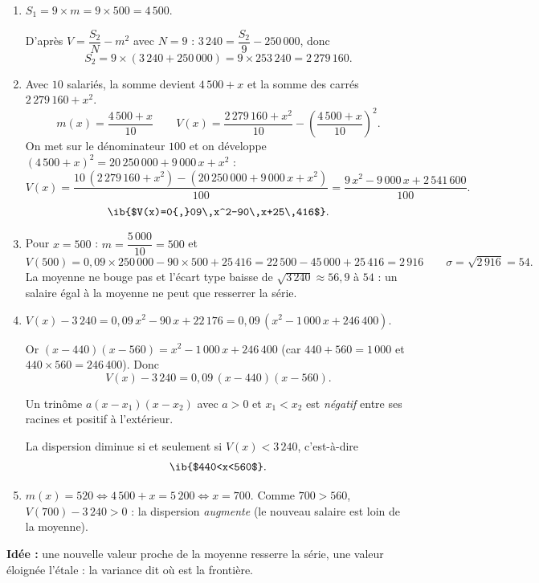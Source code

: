 \begin{enumerate}
  \item $S_1=9\times m=9\times500=4\,500$.

  D'après $V=\dfrac{S_2}{N}-m^2$ avec $N=9$ : $3\,240=\dfrac{S_2}9-250\,000$, donc
  $$S_2=9\times(3\,240+250\,000)=9\times253\,240=2\,279\,160.$$
  \item Avec $10$ salariés, la somme devient $4\,500+x$ et la somme des carrés $2\,279\,160+x^2$.
  $$m(x)=\frac{4\,500+x}{10}\qquad V(x)=\frac{2\,279\,160+x^2}{10}-\left(\frac{4\,500+x}{10}\right)^2.$$
  On met sur le dénominateur $100$ et on développe $(4\,500+x)^2=20\,250\,000+9\,000\,x+x^2$ :
  $$V(x)=\frac{10\,(2\,279\,160+x^2)-(20\,250\,000+9\,000\,x+x^2)}{100}=\frac{9\,x^2-9\,000\,x+2\,541\,600}{100}.$$
  $$ \ib{$V(x)=0{,}09\,x^2-90\,x+25\,416$}.$$
  \item Pour $x=500$ : $m=\dfrac{5\,000}{10}=500$ et
  $$V(500)=0{,}09\times250\,000-90\times500+25\,416=22\,500-45\,000+25\,416=2\,916\qquad\sigma=\sqrt{2\,916}=54.$$
  La moyenne ne bouge pas et l'écart type baisse de $\sqrt{3\,240}\approx56{,}9$ à $54$ : un salaire égal à la moyenne ne peut que resserrer la série.
  \item $V(x)-3\,240=0{,}09\,x^2-90\,x+22\,176=0{,}09\,(x^2-1\,000\,x+246\,400)$.

  Or $(x-440)(x-560)=x^2-1\,000\,x+246\,400$ (car $440+560=1\,000$ et $440\times560=246\,400$). Donc
  $$V(x)-3\,240=0{,}09\,(x-440)(x-560).$$
  \begin{prop}
  Un trinôme $a(x-x_1)(x-x_2)$ avec $a>0$ et $x_1<x_2$ est \emph{négatif} entre ses racines et positif à l'extérieur.
  \end{prop}
  La dispersion diminue si et seulement si $V(x)<3\,240$, c'est-à-dire
  $$ \ib{$440<x<560$}.$$
  \item $m(x)=520\iff4\,500+x=5\,200\iff x=700$. Comme $700>560$, $V(700)-3\,240>0$ : la dispersion \emph{augmente} (le nouveau salaire est loin de la moyenne).
\end{enumerate}

\textbf{Idée :} une nouvelle valeur proche de la moyenne resserre la série, une valeur éloignée l'étale : la variance dit où est la frontière.
